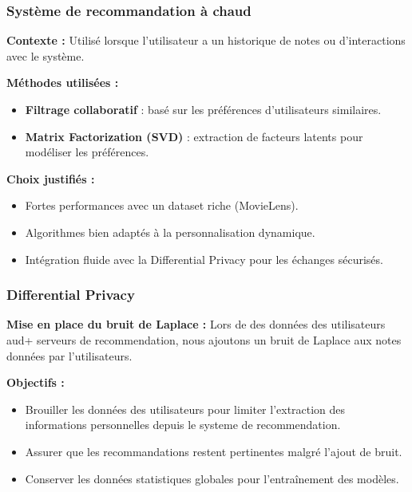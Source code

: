 \documentclass{beamer}
\begin{document}
\begin{frame}
    \scriptsize
    \frametitle{Système de recommandation à chaud}
    \textbf{Contexte :} Utilisé lorsque l’utilisateur a un historique de notes ou d’interactions avec le système.

    \vspace{0.3cm}
    \textbf{Méthodes utilisées :}
    \begin{itemize}
        \item \textbf{Filtrage collaboratif} : basé sur les préférences d’utilisateurs similaires.
        \item \textbf{Matrix Factorization (SVD)} : extraction de facteurs latents pour modéliser les préférences.
    \end{itemize}

    \vspace{0.3cm}
    \textbf{Choix justifiés :}
    \begin{itemize}
        \item Fortes performances avec un dataset riche (MovieLens).
        \item Algorithmes bien adaptés à la personnalisation dynamique.
        \item Intégration fluide avec la Differential Privacy pour les échanges sécurisés.
    \end{itemize}
\end{frame}

\begin{frame}
        \scriptsize
        \frametitle{Differential Privacy}
        \textbf{Mise en place du bruit de Laplace :}
        Lors de des données des utilisateurs aud+ serveurs de recommendation, nous ajoutons un bruit de Laplace aux notes données par l'utilisateurs.
        
        \vspace{0.3cm}
        \textbf{Objectifs :}
        \begin{itemize}
            \item Brouiller les données des utilisateurs pour limiter l'extraction des informations personnelles depuis le systeme de recommendation.
            \item Assurer que les recommandations restent pertinentes malgré l'ajout de bruit.
            \item Conserver les données statistiques globales pour l'entraînement des modèles.
        \end{itemize}
    \end{frame}
\end{document}
